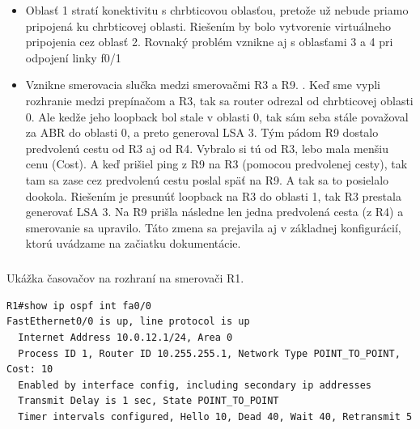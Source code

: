 \documentclass[12pt,twoside,a4paper]{article}
\begin{document}
\begin{itemize}
\item Oblasť 1 stratí konektivitu s chrbticovou oblasťou, pretože už nebude priamo pripojená ku chrbticovej oblasti. Riešením by bolo vytvorenie virtuálneho pripojenia cez oblasť 2. Rovnaký problém vznikne aj s oblasťami 3 a 4 pri odpojení linky f0/1 
\item Vznikne smerovacia slučka medzi smerovačmi R3 a R9. . Keď sme vypli rozhranie  medzi prepínačom a R3, tak sa router odrezal od chrbticovej oblasti 0. Ale kedže jeho loopback bol stale v oblasti 0, tak sám seba stále považoval za ABR do oblasti 0, a preto generoval LSA 3. Tým pádom R9 dostalo predvolenú cestu od R3 aj od R4. Vybralo si tú od R3, lebo mala menšiu cenu (Cost). A keď prišiel ping z R9 na R3 (pomocou predvolenej cesty), tak tam sa zase cez predvolenú cestu poslal späť na R9. A tak sa to posielalo dookola. Riešením je presunúť loopback na R3 do oblasti 1, tak R3 prestala generovať LSA 3. Na R9 prišla následne len jedna predvolená cesta (z R4) a smerovanie sa upravilo. Táto zmena sa prejavila aj v základnej konfigurácií, ktorú uvádzame na začiatku dokumentácie.
\end{itemize}
\subparagraph{}
Ukážka časovačov na rozhraní  na smerovači R1.
\noindent
{\selectfont
\begin{small}
\begin{verbatim}
R1#show ip ospf int fa0/0
FastEthernet0/0 is up, line protocol is up 
  Internet Address 10.0.12.1/24, Area 0 
  Process ID 1, Router ID 10.255.255.1, Network Type POINT_TO_POINT, Cost: 10
  Enabled by interface config, including secondary ip addresses
  Transmit Delay is 1 sec, State POINT_TO_POINT
  Timer intervals configured, Hello 10, Dead 40, Wait 40, Retransmit 5
\end{verbatim}
\end{small}
}
\end{document}
